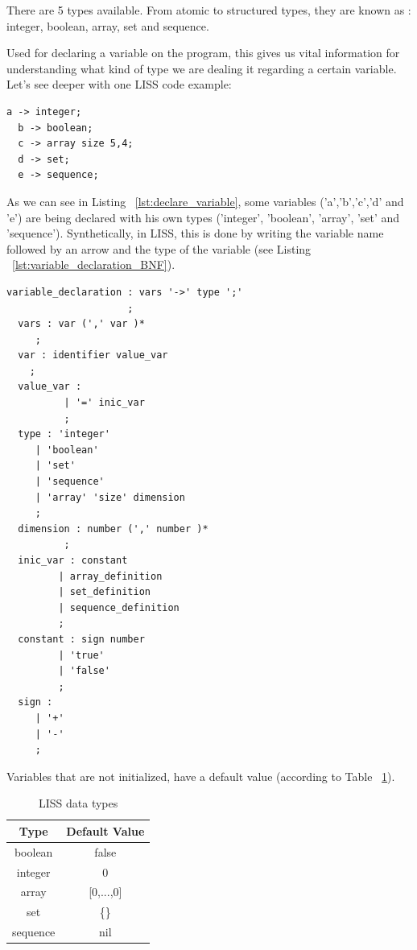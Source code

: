 \documentclass[
  oneside,
  11pt, a4paper,
  footinclude=true,
  headinclude=true,
  cleardoublepage=empty
]{scrbook}
\begin{document}
There are 5 types available.
From atomic to structured types, they are known as : integer, boolean, array, set and sequence.

Used for declaring a variable on the program, this gives us vital information for understanding what kind of type we are dealing it regarding a certain variable.
Let's see deeper with one LISS code example:

\begin{lstlisting}[caption={Declaring a variable in LISS},label={lst:declare_variable}]
  a -> integer;
  b -> boolean;
  c -> array size 5,4;
  d -> set;
  e -> sequence;
\end{lstlisting}

As we can see in Listing ~\ref{lst:declare_variable}, some variables ('a','b','c','d' and 'e')  are being declared with his own types ('integer', 'boolean', 'array', 'set' and 'sequence').
Synthetically, in LISS, this is done by writing the variable name followed by an arrow and the type of the variable (see Listing ~\ref{lst:variable_declaration_BNF}).

\begin{lstlisting}[caption={BNF of declaring a variable in LISS},label={lst:variable_declaration_BNF}]
  variable_declaration : vars '->' type ';'
                     ;
  vars : var (',' var )*
     ;
  var : identifier value_var
    ;
  value_var :
          | '=' inic_var
          ;
  type : 'integer'
     | 'boolean'
     | 'set'
     | 'sequence'
     | 'array' 'size' dimension
     ;
  dimension : number (',' number )*
          ;
  inic_var : constant
         | array_definition
         | set_definition
         | sequence_definition
         ;
  constant : sign number
         | 'true'
         | 'false'
         ;
  sign :
     | '+'
     | '-'
     ;

\end{lstlisting}

Variables that are not initialized, have a default value (according to Table ~\ref{tbl:data_types}).

\begin{table}[]
\centering
\caption{LISS data types}
\label{tbl:data_types}
\begin{tabular}{|c|c|}
\hline
\textbf{Type}       & \multicolumn{1}{l|}{\textbf{Default Value}} \\ \hline
boolean             & false                                       \\ \hline
integer             & 0                                           \\ \hline
array               & {[}0,...,0{]}                               \\ \hline
set                 & \{\}                                        \\ \hline
sequence            & nil                                         \\ \hline
\end{tabular}
\end{table}
\end{document}
